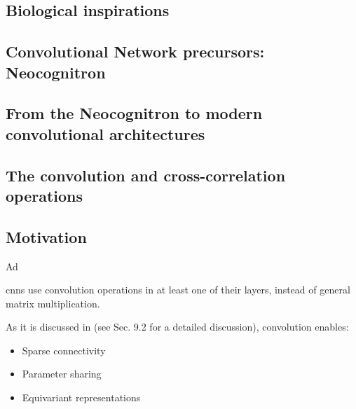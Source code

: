 \subsection{Biological inspirations}


\subsection{Convolutional Network precursors: Neocognitron}


\subsection{From the Neocognitron to modern convolutional architectures}



%
%
%

\subsection{The convolution and cross-correlation operations}


\subsection{Motivation}
\begin{frame}[t,allowframebreaks]{Ad}

    \glspl{cnn} use  \gls{convolution}
    operations in at least one of their layers, instead of general matrix multiplication.

    As it is discussed in \cite{Goodfellow:2017MITDL} 
    (see Sec. 9.2 for a detailed discussion), \gls{convolution} 
    enables:
    \begin{itemize}
        \item Sparse connectivity
        \item Parameter sharing
        \item Equivariant representations
    \end{itemize}

\end{frame}

